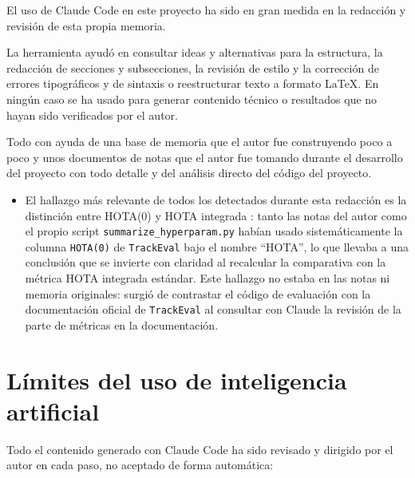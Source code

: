 El uso de Claude Code en este proyecto ha sido en gran medida en la redacción y revisión de
esta propia memoria.

La herramienta ayudó en consultar ideas y alternativas para la estructura, la redacción de secciones y subsecciones, la revisión de estilo y
la corrección de errores tipográficos y de sintaxis o reestructurar texto a formato LaTeX.
En ningún caso se ha usado para generar contenido técnico o resultados que no hayan sido verificados por el autor.

Todo con ayuda de una base de memoria que el autor fue construyendo poco a poco y unos documentos 
de notas que el autor fue tomando durante el desarrollo del proyecto con todo detalle y del análisis directo del código del proyecto.

\begin{itemize}
  \item El hallazgo más relevante de todos los detectados durante esta
        redacción es la distinción entre HOTA(0) y HOTA integrada
        : tanto las notas del
        autor como el propio script \texttt{summarize\_hyperparam.py}
        habían usado sistemáticamente la columna \texttt{HOTA(0)} de
        \texttt{TrackEval} bajo el nombre \enquote{HOTA}, lo que llevaba a una
        conclusión que se
        invierte con claridad al recalcular la comparativa con la métrica
        HOTA integrada estándar. Este hallazgo
        no estaba en las notas ni memoria originales: surgió de contrastar el código
        de evaluación con la documentación oficial de \texttt{TrackEval}
        al consultar con Claude la revisión de la parte de métricas en la documentación.
\end{itemize}

\section{Límites del uso de inteligencia artificial}
\label{sec:ia-limites}

Todo el contenido generado con Claude Code ha sido revisado y dirigido por
el autor en cada paso, no aceptado de forma automática:

